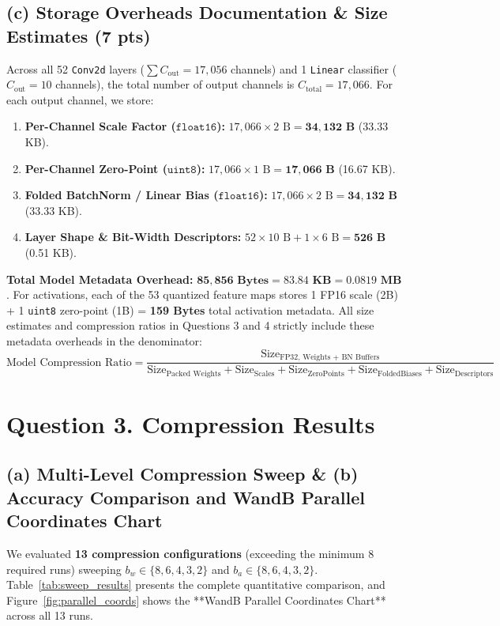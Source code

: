 \documentclass[11pt,a4paper]{article}
\begin{document}
\subsection*{(c) Storage Overheads Documentation \& Size Estimates (7 pts)}
Across all 52 \texttt{Conv2d} layers ($\sum C_{\text{out}} = 17,056$ channels) and 1 \texttt{Linear} classifier ($C_{\text{out}} = 10$ channels), the total number of output channels is $C_{\text{total}} = 17,066$. For each output channel, we store:
\begin{enumerate}\setlength\itemsep{1pt}
    \item \textbf{Per-Channel Scale Factor ($\texttt{float16}$):} $17,066 \times 2\text{ B} = \mathbf{34,132\text{ B}}$ (33.33 KB).
    \item \textbf{Per-Channel Zero-Point ($\texttt{uint8}$):} $17,066 \times 1\text{ B} = \mathbf{17,066\text{ B}}$ (16.67 KB).
    \item \textbf{Folded BatchNorm / Linear Bias ($\texttt{float16}$):} $17,066 \times 2\text{ B} = \mathbf{34,132\text{ B}}$ (33.33 KB).
    \item \textbf{Layer Shape \& Bit-Width Descriptors:} $52 \times 10\text{ B} + 1 \times 6\text{ B} = \mathbf{526\text{ B}}$ (0.51 KB).
\end{enumerate}
\textbf{Total Model Metadata Overhead:} $\mathbf{85,856\text{ Bytes} = 83.84\text{ KB} = 0.0819\text{ MB}}$. For activations, each of the 53 quantized feature maps stores 1 FP16 scale (2B) + 1 \texttt{uint8} zero-point (1B) = \textbf{159 Bytes} total activation metadata. All size estimates and compression ratios in Questions 3 and 4 strictly include these metadata overheads in the denominator:
\[
\text{Model Compression Ratio} = \frac{\text{Size}_{\text{FP32, Weights + BN Buffers}}}{\text{Size}_{\text{Packed Weights}} + \text{Size}_{\text{Scales}} + \text{Size}_{\text{ZeroPoints}} + \text{Size}_{\text{FoldedBiases}} + \text{Size}_{\text{Descriptors}}}
\]

\section*{Question 3. Compression Results}

\subsection*{(a) Multi-Level Compression Sweep \& (b) Accuracy Comparison and WandB Parallel Coordinates Chart}
We evaluated \textbf{13 compression configurations} (exceeding the minimum 8 required runs) sweeping $b_w \in \{8, 6, 4, 3, 2\}$ and $b_a \in \{8, 6, 4, 3, 2\}$. Table~\ref{tab:sweep_results} presents the complete quantitative comparison, and Figure~\ref{fig:parallel_coords} shows the **WandB Parallel Coordinates Chart** across all 13 runs.
\end{document}

